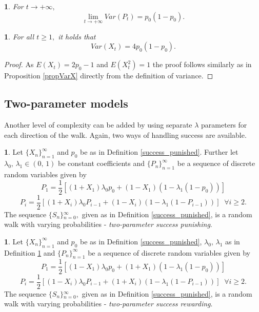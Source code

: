 \documentclass{amsart}
\theoremstyle{definition}
\newtheorem{defn}[thm]{\protect\definitionname}
\theoremstyle{plain}
\newtheorem{prop}[thm]{\protect\propositionname}
\theoremstyle{plain}
\newtheorem{cor}[thm]{\protect\corollaryname}
\theoremstyle{plain}
\numberwithin{equation}{section}
\providecommand{\corollaryname}{Corollary}
\providecommand{\definitionname}{Definition}
\providecommand{\propositionname}{Proposition}
\begin{document}
\begin{cor}
For $t\rightarrow+\infty,$ \textup{
\[
\lim_{t\to+\infty}Var(P_{t})=p_{0}(1-p_{0}).
\]
}
\end{cor}

\begin{prop}
For all $t\geq1,$ it holds that
\[
Var(X_{t})=4p_0(1-p_0).
\]
\end{prop}
\begin{proof}
As $E(X_t)=2p_0-1$ and $E(X_t^2)=1$ the proof follows similarly as in Proposition \ref{propVarX} directly from the definition of variance.
\end{proof}

\subsection{Two-parameter models}

Another level of complexity can be added by using separate $\lambda$
parameters for each direction of the walk. Again, two ways of handling
success are available. 

\begin{defn}
\label{2lambdas}Let ${\{X_{n}\}}_{n=1}^{\infty}$ and $p_{0}$ be
as in Definition \ref{success_punished}. Further let $\lambda_{0},\,\lambda_{1}\in(0,\,1)$
be constant coefficients and ${\{P_{n}\}}_{n=1}^{\infty}$ be a sequence
of discrete random variables given by
\begin{equation}
P_{1}=\frac{1}{2}[(1+X_{1})\lambda_{0}p_{0}+(1-X_{1})(1-\lambda_{1}(1-p_{0}))]\label{eq:P!1_def-1-1}
\end{equation}
\begin{equation}
P_{i}=\frac{1}{2}[(1+X_{i})\lambda_{0}P_{i-1}+(1-X_{i})(1-\lambda_{1}(1-P_{i-1}))]\;\;\forall i\geq2.\label{eq:Pi_def-1-1}
\end{equation}
The sequence ${\{S_{n}\}}{}_{n=0}^{\infty},$ given as in Definition \ref{success_punished}, is a random walk with varying probabilities - \emph{two-parameter success
punishing}.
\end{defn}


\begin{defn}
\label{2lambdas-reward}Let ${\{X_{n}\}}_{n=1}^{\infty}$ and $p_{0}$
be as in Definition \ref{success_punished}, $\lambda_{0},\,\lambda_{1}$
as in Definition \ref{2lambdas} and ${\{P_{n}\}}_{n=1}^{\infty}$ be a sequence
of discrete random variables given by
\[
P_{1}=\frac{1}{2}[(1-X_{1})\lambda_{0}p_{0}+(1+X_{1})(1-\lambda_{1}(1-p_{0}))]
\]
\[
P_{i}=\frac{1}{2}[(1-X_{i})\lambda_{0}P_{i-1}+(1+X_{i})(1-\lambda_{1}(1-P_{i-1}))]\;\;\forall i\geq2.
\]
The sequence ${\{S_{n}\}}{}_{n=0}^{\infty},$ given as in Definition \ref{success_punished}, is a random walk with varying probabilities - \emph{two-parameter success
rewarding}.
\end{defn}
\end{document}
